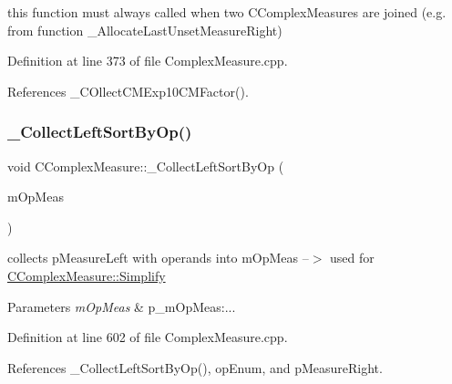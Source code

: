 this function must always called when two C\+Complex\+Measures are joined (e.\+g. from function \+\_\+\+Allocate\+Last\+Unset\+Measure\+Right) 



Definition at line 373 of file Complex\+Measure.\+cpp.



References \+\_\+\+C\+Ollect\+C\+M\+Exp10\+C\+M\+Factor().

\mbox{\label{classCComplexMeasure_ad2602b97f17c475a91454bf6bd1be1a4}} 
\subsubsection{\texorpdfstring{\+\_\+\+Collect\+Left\+Sort\+By\+Op()}{\_CollectLeftSortByOp()}}
{\footnotesize\ttfamily void C\+Complex\+Measure\+::\+\_\+\+Collect\+Left\+Sort\+By\+Op (\begin{DoxyParamCaption}\item[{map$<$ \hyperlink{MeasureOperator_8h_a1431c79e3ad4b4c5bcc9f31f188538f2}{e\+Operation}, \hyperlink{classCComplexMeasure}{C\+Complex\+Measure} $\ast$$>$ \&}]{m\+Op\+Meas }\end{DoxyParamCaption})\hspace{0.3cm}{\ttfamily [protected]}}



collects p\+Measure\+Left with operands into m\+Op\+Meas --$>$ used for \hyperlink{classCComplexMeasure_addb4e69033f2c32fb3bf4a3aef5e1470}{C\+Complex\+Measure\+::\+Simplify} 


\begin{DoxyParams}{Parameters}
{\em m\+Op\+Meas} & p\+\_\+m\+Op\+Meas\+:... \\
\hline
\end{DoxyParams}


Definition at line 602 of file Complex\+Measure.\+cpp.



References \+\_\+\+Collect\+Left\+Sort\+By\+Op(), op\+Enum, and p\+Measure\+Right.

\mbox{\label{classCComplexMeasure_aed6efc43efe99d8cf1072ac98ec8d21c}} 
